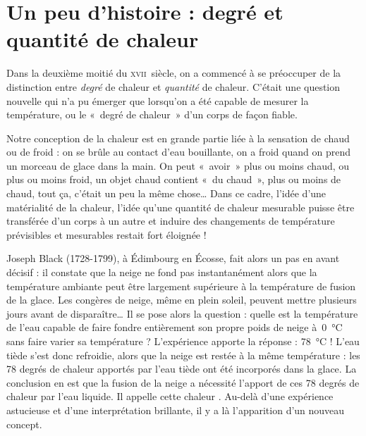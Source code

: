\atstartofhistorysection
\section[Un peu d’histoire : degré et quantité  de chaleur]{Un peu d’histoire :\onlyamphibook{\\} degré et quantité  de chaleur}
\label{ch_histoire_quantite_chaleur_depondt}


	Dans la deuxième moitié du \textsc{xvii}\ieme\ siècle, on a commencé à se préoccuper de la distinction entre \emph{degré} de chaleur et \emph{quantité} de chaleur. C'était une question nouvelle qui n'a pu émerger que lorsqu'on a été capable de mesurer la température, ou le «~degré de chaleur~» d'un corps de façon fiable.

	Notre conception de la chaleur est en grande partie liée à la sensation de chaud ou de froid : on se brûle au contact d'eau bouillante, on a froid quand on prend un morceau de glace dans la main. On peut «~avoir~» plus ou moins chaud, ou plus ou moins froid, un objet chaud contient «~du chaud~», plus ou moins de chaud, tout ça, c'était un peu la même chose… Dans ce cadre, l'idée d'une matérialité de la chaleur, l'idée qu'une quantité de chaleur mesurable puisse être transférée d'un corps à un autre et induire des changements de température prévisibles et mesurables restait fort éloignée !

	Joseph Black (1728-1799), à Édimbourg en Écosse, fait alors un pas en avant décisif : il constate que la neige ne fond pas instantanément alors que la température ambiante peut être largement supérieure à la température de fusion de la glace. Les congères de neige, même en plein soleil, peuvent mettre plusieurs jours avant de disparaître… Il se pose alors la question : quelle est la température de l’eau capable de faire fondre entièrement son propre poids de neige à~\SI{0}{\degreeCelsius} sans faire varier sa température ? L’expérience apporte la réponse : \SI{78}{\degreeCelsius} ! L'eau tiède s'est donc refroidie, alors que la neige est restée à la même température : les 78 degrés de chaleur apportés par l'eau tiède ont été incorporés dans la glace. La conclusion en est que la fusion de la neige a nécessité l'apport de ces 78 degrés de chaleur par l'eau liquide. Il appelle cette chaleur . Au-delà d'une expérience astucieuse et d'une interprétation brillante, il y a là l'apparition d'un nouveau concept.

